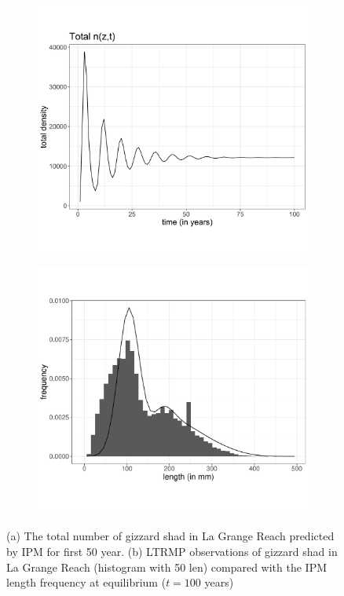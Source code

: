 \documentclass[preprint,review,12pt,authoryear]{elsarticle}
\begin{document}
\begin{figure}
\centering
\begin{subfigure}[b]{.43\textwidth}
  \includegraphics[width=\textwidth]{figures/ntotal.png}
   \caption{}
  \label{fig:ntotal}
\end{subfigure}
\begin{subfigure}[b]{.43\textwidth}
   \includegraphics[width=\textwidth]{figures/lagrange.pdf}
     \caption{}
\label{fig:lagrange}
\end{subfigure}
\caption{(a) The total number of gizzard shad in La Grange Reach predicted by IPM for first 50 year. (b) LTRMP observations of gizzard shad in La Grange Reach (histogram with 50 len) compared with the IPM length frequency at equilibrium ($t=100$ years)}
\end{figure}    
\end{document}
